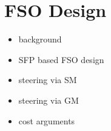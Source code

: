 \section{FSO Design}

\begin{itemize}
\item background
\item SFP based FSO design
\item steering via SM
\item steering via GM
\item cost arguments
\end{itemize}
